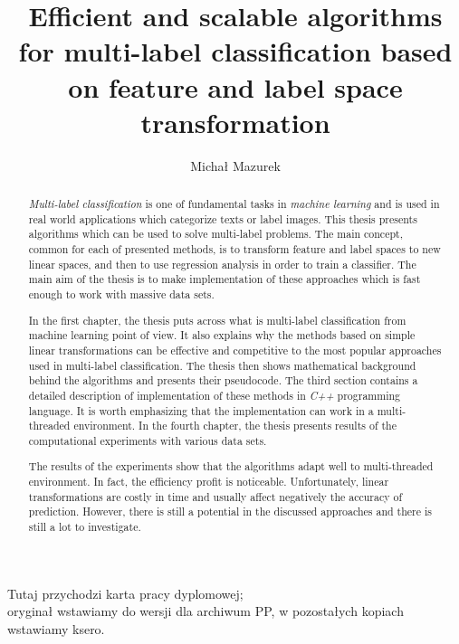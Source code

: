 \documentclass[english,a4paper,twoside]{ppfcmthesis}
\author{Michał Mazurek}
\title{Efficient and scalable algorithms for multi-label classification based on feature and label space transformation}
\begin{document}
\frontmatter\pagestyle{empty}%
\maketitle\cleardoublepage%

\thispagestyle{empty}\vspace*{\fill}%
\begin{center}Tutaj przychodzi karta pracy dyplomowej;\\oryginał wstawiamy do wersji dla archiwum PP, w pozostałych kopiach wstawiamy ksero.\end{center}%
\vfill\cleardoublepage%

\pagestyle{ppfcmthesis}%


\begin{abstract}
\thispagestyle{plain}

\textit{Multi-label classification} is one of fundamental tasks in \textit{machine learning} and is used in real world applications which categorize texts or label images. This thesis presents algorithms which can be used to solve multi-label problems. The main concept, common for each of presented methods, is to transform feature and label spaces to new linear spaces, and then to use regression analysis in order to train a classifier. The main aim of the thesis is to make implementation of these approaches which is fast enough to work with massive data sets.

In the first chapter, the thesis puts across what is multi-label classification from machine learning point of view. It also explains why the methods based on simple linear transformations can be effective and competitive to the most popular approaches used in multi-label classification. The thesis then shows mathematical background behind the algorithms and presents their pseudocode. The third section contains a detailed description of implementation of these methods in \textit{C++} programming language. It is worth emphasizing that the implementation can work in a multi-threaded environment. In the fourth chapter, the thesis presents results of the computational experiments with various data sets.  

The results of the experiments show that the algorithms adapt well to multi-threaded environment. In fact, the efficiency profit is noticeable. Unfortunately, linear transformations are costly in time and usually affect negatively the accuracy of prediction. However, there is still a potential in the discussed approaches and there is still a lot to investigate.

\end{abstract}
\cleardoublepage
\end{document}
